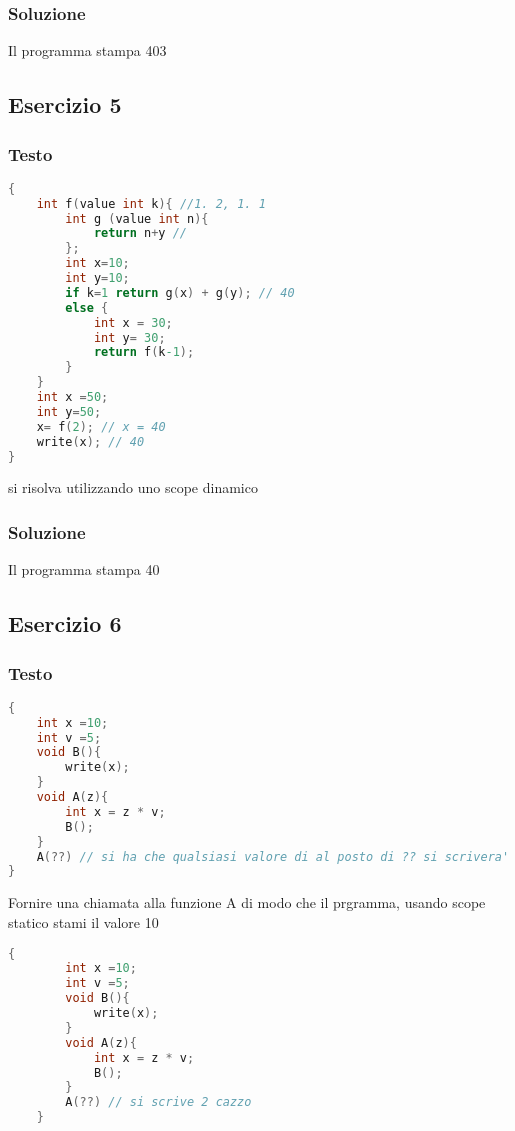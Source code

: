 \subsubsection{Soluzione}
Il programma stampa 403

\subsection{Esercizio 5}
\subsubsection{Testo}
\begin{lstlisting}[language=C]
{  
    int f(value int k){ //1. 2, 1. 1
        int g (value int n){
            return n+y //
        };
        int x=10;
        int y=10;
        if k=1 return g(x) + g(y); // 40
        else {
            int x = 30; 
            int y= 30;
            return f(k-1);
        }
    }
    int x =50;
    int y=50;
    x= f(2); // x = 40
    write(x); // 40
}
\end{lstlisting}
si risolva utilizzando uno scope dinamico

\subsubsection{Soluzione}
Il programma stampa 40

\subsection{Esercizio 6}
\subsubsection{Testo}
\begin{lstlisting}[language=C]
{
    int x =10;
    int v =5;
    void B(){
        write(x);
    }
    void A(z){
        int x = z * v;
        B();
    }
    A(??) // si ha che qualsiasi valore di al posto di ?? si scrivera' 10
}
\end{lstlisting}
Fornire una chiamata alla funzione A di modo che il prgramma, usando scope statico stami il valore 10
\begin{lstlisting}[language=C]
    {
        int x =10;
        int v =5;
        void B(){
            write(x);
        }
        void A(z){
            int x = z * v;
            B();
        }
        A(??) // si scrive 2 cazzo
    }
\end{lstlisting}

